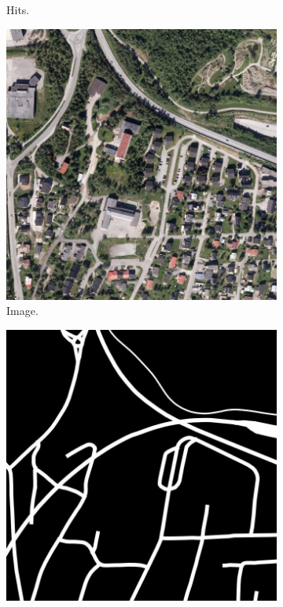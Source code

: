 \begin{figure}[H]
\begin{subfigure}{0.23\textwidth}
\caption{ Hits. }
\vspace{0.1cm} %
\end{subfigure}
\begin{subfigure}{0.23\textwidth}
\includegraphics[width=\textwidth]{figs/appendix/img1217.jpg}
\caption{ Image.}
\vspace{0.1cm} %
\end{subfigure}
\hspace*{\fill} %
\begin{subfigure}{0.23\textwidth}
\includegraphics[width=\textwidth]{figs/appendix/label1217.jpg}

\end{subfigure}
\end{figure}
